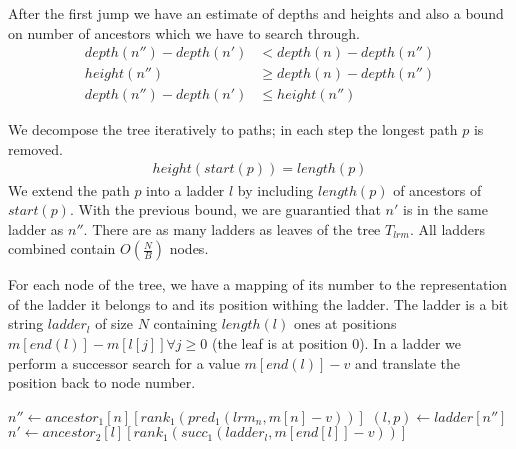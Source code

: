 After the first jump we have an estimate of depths and heights and also a bound on number of ancestors which we have to search through.
\begin{align*}
depth(n'') - depth(n') &< depth(n) - depth(n'') \\
height(n'') &\ge depth(n) - depth(n'') \\
depth(n'') - depth(n') &\le height(n'')
\end{align*}

We decompose the tree iteratively to paths; in each step the longest path $p$ is removed.
\begin{align*}
height(start(p)) = length(p)
\end{align*}
We extend the path $p$ into a ladder $l$ by including $length(p)$ of ancestors of $start(p)$.
With the previous bound, we are guarantied that $n'$ is in the same ladder as $n''$.
There are as many ladders as leaves of the tree $T_{lrm}$.
All ladders combined contain $O\left(\frac{N}{B}\right)$ nodes.

For each node of the tree, we have a mapping of its number to the representation of the ladder it belongs to and its position withing the ladder.
The ladder is a bit string $ladder_l$ of size $N$ containing $length(l)$ ones at positions $m[end(l)] - m[l[j]] \forall j \ge 0$ (the leaf is at position $0$).
In a ladder we perform a successor search for a value $m[end(l)] - v$ and translate the position back to node number.

\begin{algorithmic}
	\State $n'' \gets ancestor_1[n][rank_1(pred_1(lrm_n, m[n] - v))]$
	\State $(l, p) \gets ladder[n'']$ 
	\State $n' \gets ancestor_2[l][rank_1(succ_1(ladder_l, m[end[l]] - v))]$
\EndFunction
\end{algorithmic}

